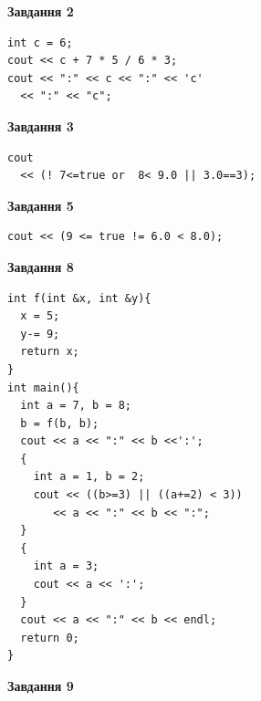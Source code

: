 \documentclass[12pt, ukrainian]{article}
\begin{document}
{\begin {large}
\begin{minipage}[t]{7.0cm}
\end{minipage}
\vline \hspace{1mm}
\begin{minipage}[t]{11.0cm}

\begin{center}
\textbf{Завдання 2}
\end{center}
\vspace{-8mm}

\begin{verbatim}
int c = 6;
cout << c + 7 * 5 / 6 * 3;
cout << ":" << c << ":" << 'c' 
  << ":" << "c";
\end{verbatim}



\begin{center}
\textbf{Завдання 3}
\end{center}
\vspace{-8mm}

\begin{verbatim}
cout 
  << (! 7<=true or  8< 9.0 || 3.0==3);
\end{verbatim}



\begin{center}
\textbf{Завдання 5}
\end{center}
\vspace{-8mm}

\begin{verbatim}
cout << (9 <= true != 6.0 < 8.0);
\end{verbatim}



\begin{center}
\textbf{Завдання 8}
\end{center}
\vspace{-8mm}

\begin{verbatim}
int f(int &x, int &y){
  x = 5;
  y-= 9;
  return x;
}
int main(){
  int a = 7, b = 8;
  b = f(b, b);
  cout << a << ":" << b <<':';
  {
    int a = 1, b = 2;
    cout << ((b>=3) || ((a+=2) < 3))
       << a << ":" << b << ":";
  }
  {
    int a = 3;
    cout << a << ':';
  }
  cout << a << ":" << b << endl;
  return 0;
}
\end{verbatim}

\end{minipage}


\begin{minipage}[t]{7.0cm}

\begin{center}
\textbf{Завдання 9}
\end{center}
\vspace{-8mm}


\end{minipage}
\end{large}}
\end{document}
